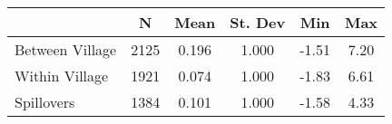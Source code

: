 \begin{tabular}{l*{5}{c}}\hline&\multicolumn{1}{c}{N}&\multicolumn{1}{c}{Mean}&\multicolumn{1}{c}{St. Dev}&\multicolumn{1}{c}{Min}&\multicolumn{1}{c}{Max}\\ \hline 
Between Village & 2125 & 0.196 & 1.000 & -1.51 & 7.20 \\
Within Village & 1921 & 0.074 & 1.000 & -1.83 & 6.61 \\
Spillovers & 1384 & 0.101 & 1.000 & -1.58 & 4.33 \\
\hline \end{tabular}
